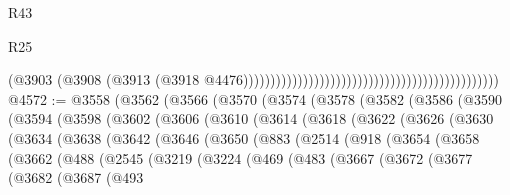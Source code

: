 \begin{lexlean}{R43}
\begin{lexlean}{R25}
\begin{coremodule}
{{{{{{{{{{{{{{{{{{{{{{{{{{{{{{{{{{{{{{{{{{{{{{{{{{{{{{{{{{{{{{{{{{{{{{{{{{{{{{{{{{{{{{{{{{{{{{{{{{{{{{{{{{{{{{{{{{{{{{{{{{{{{{{{{{{{{{{{{{{{{{{{{{{{{{{{{{{{{{{{{{{{{{{{{{{{{{{{{{{{{{{{{{{{{{{{{                                                                                          (@3903
                                                                                            (@3908
                                                                                              (@3913
                                                                                                (@3918
                                                                                                  @4476)))))))))))))))))))))))))))))))))))))))))))))))
@4572 := @3558
    (@3562
      (@3566
        (@3570
          (@3574
            (@3578
              (@3582
                (@3586
                  (@3590
                    (@3594
                      (@3598
                        (@3602
                          (@3606
                            (@3610
                              (@3614
                                (@3618
                                  (@3622
                                    (@3626
                                      (@3630
                                        (@3634
                                          (@3638
                                            (@3642
                                              (@3646
                                                (@3650
                                                  (@883
                                                    (@2514
                                                      (@918
                                                        (@3654
                                                          (@3658
                                                            (@3662
                                                              (@488
                                                                (@2545
                                                                  (@3219
                                                                    (@3224
                                                                      (@469
                                                                        (@483
                                                                          (@3667
                                                                            (@3672
                                                                              (@3677
                                                                                (@3682
                                                                                  (@3687
                                                                                    (@493
}}}}}}}}}}}}}}}}}}}}}}}}}}}}}}}}}}}}}}}}}}}}}}}}}}}}}}}}}}}}}}}}}}}}}}}}}}}}}}}}}}}}}}}}}}}}}}}}}}}}}}}}}}}}}}}}}}}}}}}}}}}}}}}}}}}}}}}}}}}}}}}}}}}}}}}}}}}}}}}}}}}}}}}}}}}}}}}}}}}}}}}}}}}}}}}}}
\end{coremodule}
\end{lexlean}
\end{lexlean}
